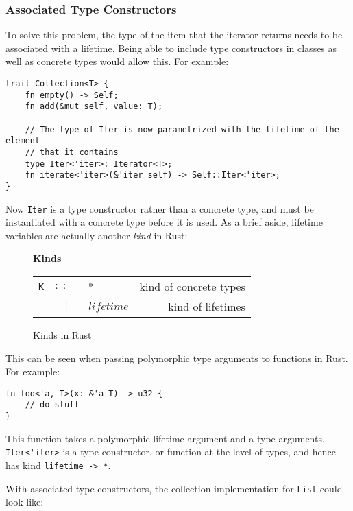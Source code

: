 \subsubsection{Associated Type Constructors}
To solve this problem, the type of the item that the iterator returns needs to
be associated with a lifetime. Being able to include type constructors in classes
as well as concrete types would allow this. For example:

\begin{lstlisting}[nolol]
trait Collection<T> {
    fn empty() -> Self;
    fn add(&mut self, value: T);

    // The type of Iter is now parametrized with the lifetime of the element
    // that it contains
    type Iter<'iter>: Iterator<T>;
    fn iterate<'iter>(&'iter self) -> Self::Iter<'iter>;
}
\end{lstlisting}

Now \lstinline{Iter} is a type constructor rather than a concrete type, and must
be instantiated with a concrete type before it is used. As a brief aside,
lifetime variables are actually another \textit{kind} in Rust:
\begin{figure}[H]
    \centering
    \vspace{1cm}
    \textbf{Kinds} \\
    \begin{tabular}{l c p{3cm} r}
        \texttt{K} & $ ::= $ & $ * $ &      kind of concrete types \\
        & $ | $ & $ lifetime $ &            kind of lifetimes  \\
    \end{tabular}
    \caption{Kinds in Rust}
\end{figure}

This can be seen when passing polymorphic type arguments to functions in Rust.
For example:

\begin{lstlisting}[nolol]
fn foo<'a, T>(x: &'a T) -> u32 {
    // do stuff
}
\end{lstlisting}

This function takes a polymorphic lifetime argument and a type arguments.
\lstinline{Iter<'iter>} is a type constructor, or function at the level of
types, and hence has kind \lstinline[mathescape]{lifetime -> *}.

With associated type constructors, the collection implementation for \lstinline{List}
could look like:

